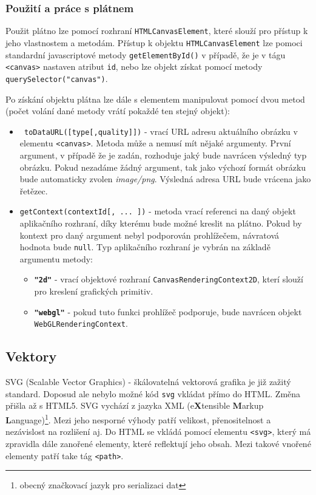 \subsubsection{Použití a práce s plátnem}
Použit plátno lze pomocí rozhraní \texttt{HTMLCanvasElement}, které slouží pro přístup k jeho vlastnostem a metodám. Přístup k objektu \texttt{HTMLCanvasElement} lze pomoci standardní javascriptové metody \texttt{getElementById()} v případě, že je v tágu \texttt{<canvas>} nastaven atribut \texttt{id}, nebo lze objekt získat pomocí metody \texttt{querySelector("canvas")}.

Po získání objektu plátna lze dále s elementem manipulovat pomocí dvou metod (počet volání dané metody vrátí pokaždé ten stejný objekt):
	 	\begin{itemize}		
			\item \texttt{ toDataURL([type[,quality]])}\newline
			 - vrací URL adresu aktuálního obrázku v elementu \texttt{<canvas>}. Metoda může a nemusí mít nějaké argumenty. První argument, v případě že je zadán, rozhoduje jaký bude navrácen výsledný typ obrázku. Pokud nezadáme žádný argument, tak jako výchozí formát obrázku bude automaticky zvolen \textit{image/png}. Výsledná adresa URL bude vrácena jako řetězec.
			\item \texttt{getContext(contextId[, ... ])}\newline
			 - metoda vrací referenci na daný objekt aplikačního rozhraní, díky kterému bude možné kreslit na plátno. Pokud by kontext pro daný argument nebyl podporován prohlížečem, návratová hodnota bude \texttt{null}. Typ aplikačního rozhraní je vybrán na základě argumentu metody:
			 \begin{itemize}
			 	\item  \texttt{\textbf{"2d"}} - vrací objektové rozhraní \texttt{CanvasRenderingContext2D}, kterí slouží pro kreslení grafických primitiv.
			 	\item \texttt{\textbf{"webgl"}} - pokud tuto funkci prohlížeč podporuje, bude navrácen objekt \newline \texttt{WebGLRenderingContext}. 
			 \end{itemize}
		 
 
		\end{itemize}

\newpage


\subsection{Vektory}
SVG (Scalable Vector Graphics) - škálovatelná vektorová grafika je již zažitý standard. Doposud ale nebylo možné kód \texttt{svg} vkládat přímo do HTML. Změna přišla až s HTML5. SVG vychází z jazyka XML (e\textbf{X}tensible \textbf{M}arkup \textbf{L}anguage)\footnote{obecný značkovací jazyk pro serializaci dat}. Mezi jeho nesporné výhody patří velikost, přenositelnost a nezávislost na rozlišení aj. Do HTML se vkládá pomocí elementu \texttt{<svg>}, který má zpravidla dále zanořené elementy, které reflektují jeho obsah. Mezi takové vnořené elementy patří take tág \texttt{<path>}.


